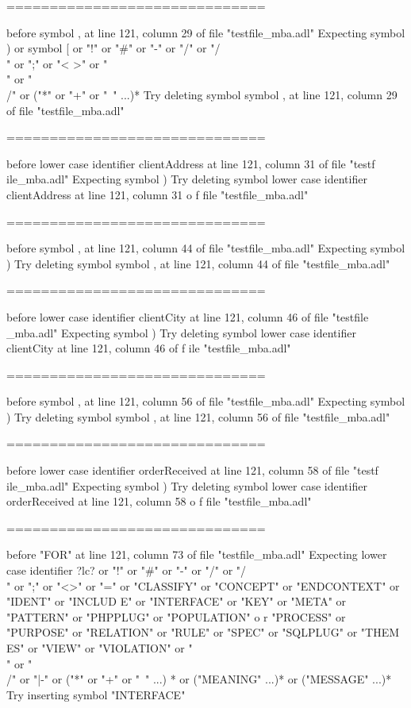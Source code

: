 \begin{description}
\begin{haskell}
{==============================

before symbol , at line 121, column 29 of file "testfile_mba.adl"
Expecting symbol ) or symbol [ or "!" or "#" or "-" or "/" or "/\\" or ";" or "<
>" or "\\" or "\\/" or ("*" or "+" or "~" ...)*
Try deleting symbol symbol , at line 121, column 29 of file "testfile_mba.adl"

==============================

before lower case identifier clientAddress at line 121, column 31 of file "testf
ile_mba.adl"
Expecting symbol )
Try deleting symbol lower case identifier clientAddress at line 121, column 31 o
f file "testfile_mba.adl"

==============================

before symbol , at line 121, column 44 of file "testfile_mba.adl"
Expecting symbol )
Try deleting symbol symbol , at line 121, column 44 of file "testfile_mba.adl"

==============================

before lower case identifier clientCity at line 121, column 46 of file "testfile
_mba.adl"
Expecting symbol )
Try deleting symbol lower case identifier clientCity at line 121, column 46 of f
ile "testfile_mba.adl"

==============================

before symbol , at line 121, column 56 of file "testfile_mba.adl"
Expecting symbol )
Try deleting symbol symbol , at line 121, column 56 of file "testfile_mba.adl"

==============================

before lower case identifier orderReceived at line 121, column 58 of file "testf
ile_mba.adl"
Expecting symbol )
Try deleting symbol lower case identifier orderReceived at line 121, column 58 o
f file "testfile_mba.adl"

==============================

before "FOR" at line 121, column 73 of file "testfile_mba.adl"
Expecting lower case identifier ?lc? or "!" or "#" or "-" or "/" or "/\\" or ";"
 or "<>" or "=" or "CLASSIFY" or "CONCEPT" or "ENDCONTEXT" or "IDENT" or "INCLUD
E" or "INTERFACE" or "KEY" or "META" or "PATTERN" or "PHPPLUG" or "POPULATION" o
r "PROCESS" or "PURPOSE" or "RELATION" or "RULE" or "SPEC" or "SQLPLUG" or "THEM
ES" or "VIEW" or "VIOLATION" or "\\" or "\\/" or "|-" or ("*" or "+" or "~" ...)
* or ("MEANING" ...)* or ("MESSAGE" ...)*
Try inserting symbol "INTERFACE"

}
\end{haskell}
\end{description}
